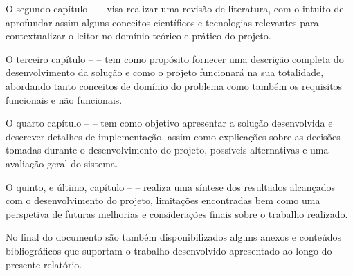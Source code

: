 O segundo capítulo –  – visa realizar uma revisão de literatura,
com o intuito de aprofundar assim alguns conceitos científicos e tecnologias relevantes para
contextualizar o leitor no domínio teórico e prático do projeto. 

O terceiro capítulo –  – tem como propósito fornecer uma descrição completa 
do desenvolvimento da solução e como o projeto funcionará na sua totalidade, abordando tanto conceitos
de domínio do problema como também os requisitos funcionais e não funcionais.

O quarto capítulo –  – tem como objetivo apresentar a solução desenvolvida
e descrever detalhes de implementação, assim como explicações sobre as decisões tomadas durante o
desenvolvimento do projeto, possíveis alternativas e uma avaliação geral do sistema.

O quinto, e último, capítulo –  – realiza uma síntese dos resultados 
alcançados com o desenvolvimento do projeto, limitações encontradas bem como uma perspetiva de 
futuras melhorias e considerações finais sobre o trabalho realizado.

No final do documento são também disponibilizados alguns anexos e conteúdos bibliográficos 
que suportam o trabalho desenvolvido apresentado ao longo do presente relatório.
